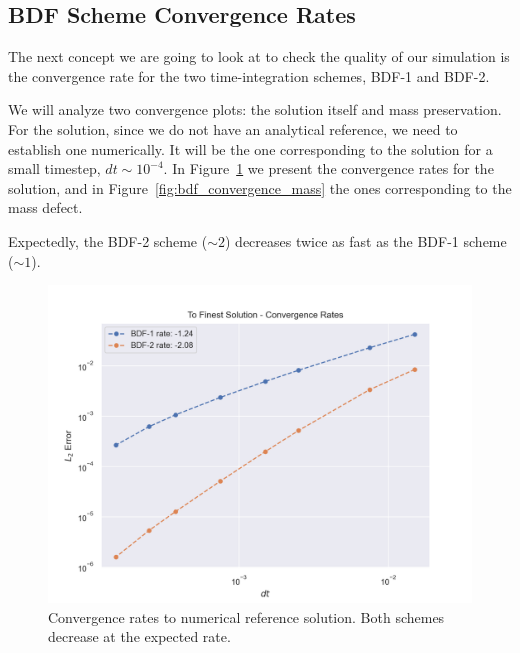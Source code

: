 \documentclass[../../thesis.tex]{subfiles}
\begin{document}
\subsection{BDF Scheme Convergence Rates}
\label{sec:fom_calibration_bdf_convergence_rates}
The next concept we are going to look at to check the quality of our simulation is 
the convergence rate for the two time-integration schemes, 
BDF-1 and BDF-2.

We will analyze two convergence plots: the solution itself and mass preservation.
For the solution, since we do not have an analytical reference, we need to establish one numerically.
It will be the one corresponding to the solution for a small timestep, $dt \sim 10^{-4}$.
In Figure~\ref{fig:bdf_convergence_solutions} we present the convergence rates for the solution,
and in Figure~\ref{fig:bdf_convergence_mass} the ones corresponding to the mass defect.

Expectedly, the BDF-2 scheme ($\sim 2$) decreases twice as fast as the BDF-1 scheme ($\sim 1$).
\begin{figure}[h]
    \centering
    \includegraphics[width=1\columnwidth]{research_project/piston/figures/bdf_convergence/convergence_finest_solution.png}
    \caption{Convergence rates to numerical reference solution.
    Both schemes decrease at the expected rate.}
    \label{fig:bdf_convergence_solutions}
\end{figure}
\end{document}
